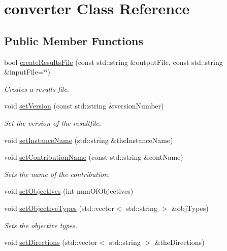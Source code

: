 \hypertarget{classconverter}{}\section{converter Class Reference}
\label{classconverter}
\subsection*{Public Member Functions}
\begin{DoxyCompactItemize}
\item 
bool \hyperlink{classconverter_aa3042d649da8ea07f914b7eea5014703}{create\+Results\+File} (const std\+::string \&output\+File, const std\+::string \&input\+File=\char`\"{}\char`\"{})
\begin{DoxyCompactList}\small\item\em Creates a results file. \end{DoxyCompactList}\item 
void \hyperlink{classconverter_a825aad7cfc1aabfbef527d064a6edf1e}{set\+Version} (const std\+::string \&version\+Number)
\begin{DoxyCompactList}\small\item\em Set the version of the resultfile. \end{DoxyCompactList}\item 
void \hyperlink{classconverter_a6ccb23d7caebaba593b02f37689a382f}{set\+Instance\+Name} (std\+::string \&the\+Instance\+Name)
\item 
void \hyperlink{classconverter_a848a8e67f350303fc2d89a2be74a4c6d}{set\+Contribution\+Name} (const std\+::string \&cont\+Name)
\begin{DoxyCompactList}\small\item\em Sets the name of the contribution. \end{DoxyCompactList}\item 
void \hyperlink{classconverter_a8b216dcddabf7fba23797689befa88d8}{set\+Objectives} (int num\+Of\+Objectives)
\item 
void \hyperlink{classconverter_a44373216fde05163ca7c5267088145fa}{set\+Objective\+Types} (std\+::vector$<$ std\+::string $>$ \&obj\+Types)
\begin{DoxyCompactList}\small\item\em Sets the objective types. \end{DoxyCompactList}\item 
void \hyperlink{classconverter_aef8cb59efa0d7a9c34c83b5701658d8b}{set\+Directions} (std\+::vector$<$ std\+::string $>$ \&the\+Directions)

\end{DoxyCompactItemize}
